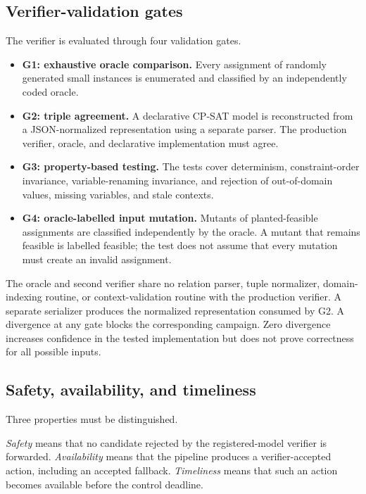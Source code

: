 \documentclass[pdflatex,sn-mathphys-num,iicol,oneside]{sn-jnl}
\newcommand{\cpsat}{\textsc{CP-SAT}\xspace}
\begin{document}
\subsection{Verifier-validation gates}
\label{sec:verifier-gates}

The verifier is evaluated through four validation gates.

\begin{itemize}

\item \textbf{G1: exhaustive oracle comparison.}
Every assignment of randomly generated small instances is enumerated
and classified by an independently coded oracle.

\item \textbf{G2: triple agreement.}
A declarative \cpsat model is reconstructed from a JSON-normalized
representation using a separate parser. The production verifier,
oracle, and declarative implementation must agree.

\item \textbf{G3: property-based testing.}
The tests cover determinism, constraint-order invariance,
variable-renaming invariance, and rejection of out-of-domain values,
missing variables, and stale contexts.

\item \textbf{G4: oracle-labelled input mutation.}
Mutants of planted-feasible assignments are classified independently
by the oracle. A mutant that remains feasible is labelled feasible;
the test does not assume that every mutation must create an invalid
assignment.

\end{itemize}

The oracle and second verifier share no relation parser, tuple
normalizer, domain-indexing routine, or context-validation routine
with the production verifier. A separate serializer produces the
normalized representation consumed by G2. A divergence at any gate
blocks the corresponding campaign. Zero divergence increases
confidence in the tested implementation but does not prove correctness
for all possible inputs.

\subsection{Safety, availability, and timeliness}
\label{sec:timing-semantics}

Three properties must be distinguished.

\emph{Safety} means that no candidate rejected by the
registered-model verifier is forwarded. \emph{Availability} means
that the pipeline produces a verifier-accepted action, including an
accepted fallback. \emph{Timeliness} means that such an action becomes
available before the control deadline.
\end{document}
